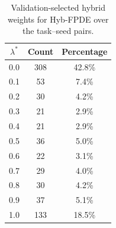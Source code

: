 \begin{table}[!tbp]
    \caption{Validation-selected hybrid weights for Hyb-FPDE over the task--seed pairs.}
    \label{tab:lambda_distribution}
    \centering
    \begin{tabular}{ccc}
        \toprule
        $\lambda^*$ & Count & Percentage  \\
        \midrule
        0.0 & 308 & 42.8\% \\
        0.1 & 53 & 7.4\% \\
        0.2 & 30 & 4.2\% \\
        0.3 & 21 & 2.9\% \\
        0.4 & 21 & 2.9\% \\
        0.5 & 36 & 5.0\% \\
        0.6 & 22 & 3.1\% \\
        0.7 & 29 & 4.0\% \\
        0.8 & 30 & 4.2\% \\
        0.9 & 37 & 5.1\% \\
        1.0 & 133 & 18.5\% \\
        \bottomrule
    \end{tabular}
\end{table}
